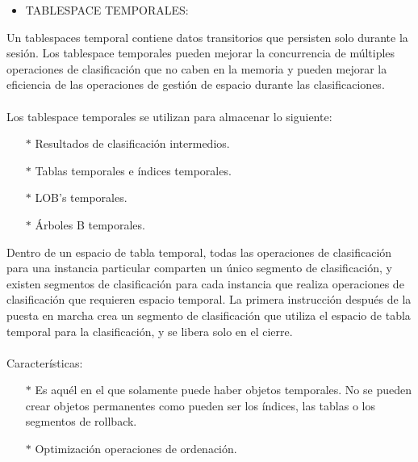 \begin{itemize}
	\item TABLESPACE TEMPORALES:
\end{itemize}
\begin{adjustwidth}{0.40in}{0.0in}
	Un tablespaces temporal contiene datos transitorios que persisten solo durante la sesión. Los tablespace temporales pueden mejorar la concurrencia de múltiples operaciones de clasificación que no caben en la memoria y pueden mejorar la eficiencia de las operaciones de gestión de espacio durante las clasificaciones.\\ \\
	Los tablespace temporales se utilizan para almacenar lo siguiente:
	\begin{itemize}
		\item[$*$] Resultados de clasificación intermedios.
		\item[$*$] Tablas temporales e índices temporales.
		\item[$*$] LOB's temporales.
		\item[$*$] Árboles B temporales.\\
	\end{itemize}
	Dentro de un espacio de tabla temporal, todas las operaciones de clasificación para una instancia particular comparten un único segmento de clasificación, y existen segmentos de clasificación para cada instancia que realiza operaciones de clasificación que requieren espacio temporal. La primera instrucción después de la puesta en marcha crea un segmento de clasificación que utiliza el espacio de tabla temporal para la clasificación, y se libera solo en el cierre.\\ \\
	Características:
	\begin{itemize}
		\item[$*$] Es aquél en el que solamente puede haber objetos temporales. No se pueden crear objetos permanentes como pueden ser los índices, las tablas o los segmentos de rollback.
		\item[$*$] Optimización operaciones de ordenación.\\
	\end{itemize}		
\end{adjustwidth}

\newpage

